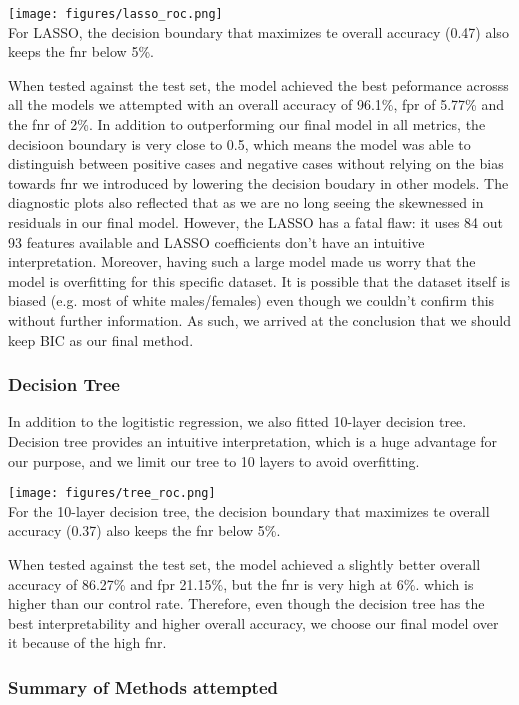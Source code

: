 \documentclass{article}
\begin{document}
\texttt{[image: figures/lasso\_roc.png]}\\

For LASSO, the decision boundary that maximizes te overall accuracy (0.47) also
keeps the fnr below 5\%.

When tested against the test set, the model achieved the best peformance acrosss
all the models we attempted with an overall accuracy of 96.1\%,  fpr of 5.77\%
and the fnr of 2\%. In addition to outperforming our final model in all metrics,
the decisioon boundary is very close to 0.5, which means the model was able to
distinguish between positive cases and negative cases without relying on the
bias towards fnr we introduced by lowering the decision boudary in other models.
The diagnostic plots also reflected that as we are no long seeing the skewnessed
in residuals in our final model. However, the LASSO has a fatal flaw: it uses
84 out 93 features available and LASSO coefficients don't have an intuitive
interpretation. Moreover, having such a large model made us worry that the model
is overfitting for this specific dataset. It is possible that the dataset itself
is biased (e.g. most of white males/females) even though we couldn't confirm
this without further information. As such, we arrived at the conclusion that we
should keep BIC as our final method.


\subsubsection{Decision Tree}
In addition to the logitistic regression, we also fitted 10-layer decision tree.
Decision tree provides an intuitive interpretation, which is a huge advantage
for our purpose, and we limit our tree to 10 layers to avoid overfitting.

\texttt{[image: figures/tree\_roc.png]}\\

For the 10-layer decision tree, the decision boundary that maximizes te overall
accuracy (0.37) also keeps the fnr below 5\%.

When tested against the test set, the model achieved a slightly better overall
accuracy of 86.27\% and fpr 21.15\%, but the fnr is very high at 6\%. which is
higher than our control rate. Therefore, even though the decision tree has the
best interpretability and higher overall accuracy, we choose our final model
over it because of the high fnr.

\subsubsection{Summary of Methods attempted}
\end{document}
